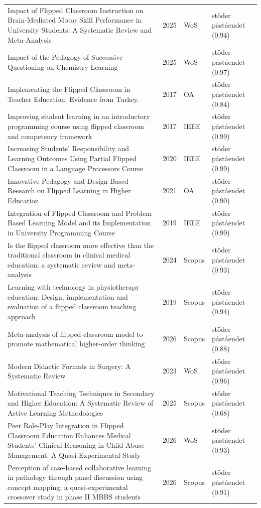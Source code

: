 \begin{longtable}{@{}%
  >{\raggedright\arraybackslash}p{}c%
  >{\raggedright\arraybackslash}p{}%
  >{\raggedright\arraybackslash}p{}@{}}
Impact of Flipped Classroom Instruction on Brain-Mediated Motor Skill Performance in University Students: A Systematic Review and Meta-Analysis & 2025 & WoS & stöder påståendet (0.94) \\
Impact of the Pedagogy of Successive Questioning on Chemistry Learning & 2025 & WoS & stöder påståendet (0.97) \\
Implementing the Flipped Classroom in Teacher Education: Evidence from Turkey. & 2017 & OA & stöder påståendet (0.84) \\
Improving student learning in an introductory programming course using flipped classroom and competency framework & 2017 & IEEE & stöder påståendet (0.99) \\
Increasing Students' Responsibility and Learning Outcomes Using Partial Flipped Classroom in a Language Processors Course & 2020 & IEEE & stöder påståendet (0.99) \\
Innovative Pedagogy and Design-Based Research on Flipped Learning in Higher Education & 2021 & OA & stöder påståendet (0.90) \\
Integration of Flipped Classroom and Problem Based Learning Model and its Implementation in University Programming Course & 2019 & IEEE & stöder påståendet (0.99) \\
Is the flipped classroom more effective than the traditional classroom in clinical medical education: a systematic review and meta-analysis & 2024 & Scopus & stöder påståendet (0.93) \\
Learning with technology in physiotherapy education: Design, implementation and evaluation of a flipped classroom teaching approach & 2019 & Scopus & stöder påståendet (0.94) \\
Meta-analysis of flipped classroom model to promote mathematical higher-order thinking & 2026 & Scopus & stöder påståendet (0.88) \\
Modern Didactic Formats in Surgery: A Systematic Review & 2023 & WoS & stöder påståendet (0.96) \\
Motivational Teaching Techniques in Secondary and Higher Education: A Systematic Review of Active Learning Methodologies & 2025 & Scopus & stöder påståendet (0.68) \\
Peer Role-Play Integration in Flipped Classroom Education Enhances Medical Students' Clinical Reasoning in Child Abuse Management: A Quasi-Experimental Study & 2026 & WoS & stöder påståendet (0.93) \\
Perception of case-based collaborative learning in pathology through panel discussion using concept mapping: a quasi-experimental crossover study in phase II MBBS students & 2026 & Scopus & stöder påståendet (0.91) \\

\end{longtable}
